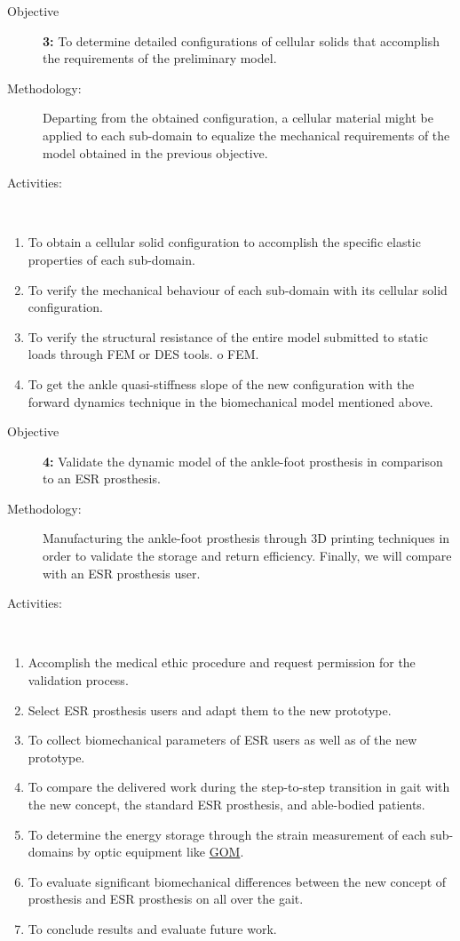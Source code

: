 \documentclass[12pt,english]{article}
\begin{document}
\begin{description}
\item [{Objective}]  \textbf{ 3: }To determine detailed configurations of cellular solids that accomplish the requirements of the preliminary model.
\item [{Methodology:}] Departing from the obtained configuration, a cellular material might be applied to each sub-domain to equalize the mechanical requirements of the model obtained in the previous objective.
\item [{Activities:}]~\end{description}
\begin{enumerate}
\item To obtain a cellular solid configuration to accomplish the specific elastic properties of each sub-domain.
\item To verify the mechanical behaviour of each sub-domain with its cellular solid configuration.  
\item To verify the structural resistance of the entire model submitted to static loads through FEM or DES tools.
o FEM.
\item To get the ankle quasi-stiffness slope of the new configuration with the forward dynamics technique in the biomechanical model mentioned above.
\end{enumerate}
\begin{description}
\item [{Objective}]  \textbf{ 4:} Validate the dynamic model of the ankle-foot prosthesis in comparison to an ESR prosthesis.
\item [{Methodology:}] Manufacturing the ankle-foot prosthesis through 3D printing techniques in order to validate the storage and return efficiency. Finally, we will compare with an ESR prosthesis user.
\item [{Activities:}]~\end{description}
\begin{enumerate}
\item Accomplish the medical ethic procedure and request permission for the validation process.
\item Select ESR prosthesis users and adapt them to the new prototype.
\item To collect biomechanical parameters of ESR users as well as of the new prototype. 
\item To compare the delivered work during the step-to-step transition in gait with the new concept, the standard ESR prosthesis, and able-bodied patients.
\item To determine the energy storage through the strain measurement of each sub-domains by optic equipment like \href{http://www.gom.com/industries/medical-technology/biomechanics.html}{GOM}.
\item To evaluate significant biomechanical differences between the new concept of prosthesis and ESR prosthesis on all over the gait.
\item To conclude results and evaluate future work. 
\end{enumerate}
\end{document}
